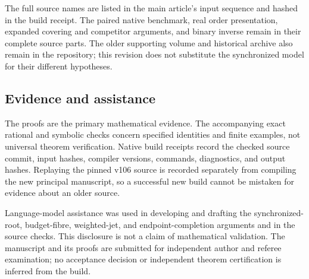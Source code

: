 The full source names are listed in the main article's input sequence and hashed in the build receipt. The paired native benchmark, real order presentation, expanded covering and competitor arguments, and binary inverse remain in their complete source parts. The older supporting volume and historical archive also remain in the repository; this revision does not substitute the synchronized model for their different hypotheses.

\subsection*{Evidence and assistance}
The proofs are the primary mathematical evidence. The accompanying exact rational and symbolic checks concern specified identities and finite examples, not universal theorem verification. Native build receipts record the checked source commit, input hashes, compiler versions, commands, diagnostics, and output hashes. Replaying the pinned v106 source is recorded separately from compiling the new principal manuscript, so a successful new build cannot be mistaken for evidence about an older source.

Language-model assistance was used in developing and drafting the synchronized-root, budget-fibre, weighted-jet, and endpoint-completion arguments and in the source checks. This disclosure is not a claim of mathematical validation. The manuscript and its proofs are submitted for independent author and referee examination; no acceptance decision or independent theorem certification is inferred from the build.
